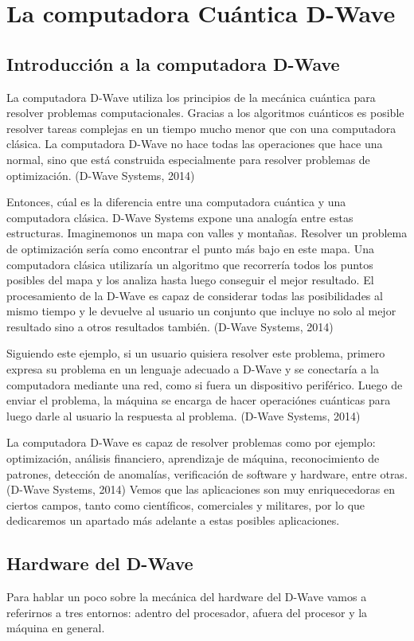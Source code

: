 \documentclass[11pt,a4paper]{article}
\begin{document}
\section*{La computadora Cuántica D-Wave}
\subsection*{Introducción a la computadora D-Wave}

La computadora D-Wave utiliza los principios de la mecánica cuántica para resolver problemas computacionales. Gracias a los algoritmos cuánticos es posible resolver tareas complejas en un tiempo mucho menor que con una computadora clásica. La computadora D-Wave no hace todas las operaciones que hace una normal, sino que está construida especialmente para resolver problemas de optimización. (D-Wave Systems, 2014)

Entonces, cúal es la diferencia entre una computadora cuántica y una computadora clásica. D-Wave Systems expone una analogía entre estas estructuras. Imaginemonos un mapa con valles y montañas. Resolver un problema de optimización sería como encontrar el punto más bajo en este mapa. Una computadora clásica utilizaría un algoritmo que recorrería todos los puntos posibles del mapa y los analiza hasta luego conseguir el mejor resultado. El procesamiento de la D-Wave es capaz de considerar todas las posibilidades al mismo tiempo y le devuelve al usuario un conjunto que incluye no solo al mejor resultado sino a otros resultados también. (D-Wave Systems, 2014)

Siguiendo este ejemplo, si un usuario quisiera resolver este problema, primero expresa su problema en un lenguaje adecuado a D-Wave y se conectaría a la computadora mediante una red, como si fuera un dispositivo periférico. Luego de enviar el problema, la máquina se encarga de hacer operaciónes cuánticas para luego darle al usuario la respuesta al problema.  (D-Wave Systems, 2014)

La computadora D-Wave es capaz de resolver problemas como por ejemplo: optimización, análisis financiero, aprendizaje de máquina, reconocimiento de patrones, detección de anomalías, verificación de software y hardware, entre otras. (D-Wave Systems, 2014) Vemos que las aplicaciones son muy enriquecedoras en ciertos campos, tanto como científicos, comerciales y militares, por lo que dedicaremos un apartado más adelante a estas posibles aplicaciones.

\subsection*{Hardware del D-Wave}
Para hablar un poco sobre la mecánica del hardware del D-Wave vamos a referirnos a tres entornos: adentro del procesador, afuera del procesor y la máquina en general.
\end{document}
